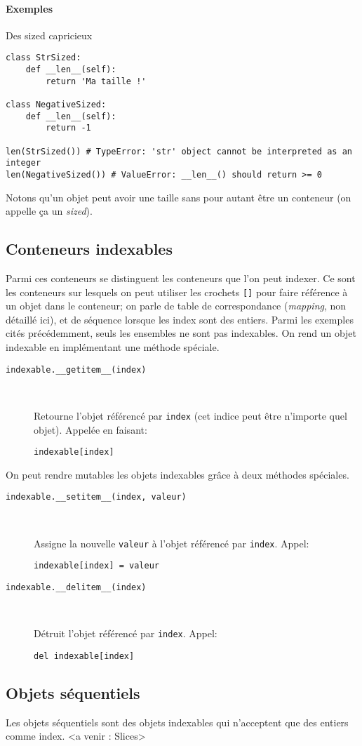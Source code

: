 \paragraph{Exemples} Des \og sized \fg{} capricieux
\begin{verbatim}
class StrSized:
    def __len__(self):
        return 'Ma taille !'

class NegativeSized:
    def __len__(self):
        return -1

len(StrSized()) # TypeError: 'str' object cannot be interpreted as an integer
len(NegativeSized()) # ValueError: __len__() should return >= 0
\end{verbatim}

Notons qu'un objet peut avoir une taille sans pour autant être un conteneur (on appelle ça un \emph{sized}).

\subsection{Conteneurs indexables}
Parmi ces conteneurs se distinguent les conteneurs que l'on peut indexer. Ce sont les conteneurs sur lesquels on peut utiliser les crochets \texttt{[]} pour faire référence à un objet dans le conteneur; on parle de table de correspondance (\emph{mapping}, non détaillé ici), et de séquence lorsque les index sont des entiers. Parmi les exemples cités précédemment, seuls les ensembles ne sont pas indexables. On rend un objet indexable en implémentant une méthode spéciale.

\begin{description}
    \item[\texttt{indexable.__getitem__(index)}]~

    Retourne l'objet référencé par \texttt{index} (cet indice peut être n'importe quel objet). Appelée en faisant:
    \begin{verbatim}
indexable[index]
    \end{verbatim}
\end{description}

On peut rendre mutables les objets indexables grâce à deux méthodes spéciales.

\begin{description}
    \item[\texttt{indexable.__setitem__(index, valeur)}]~

    Assigne la nouvelle \texttt{valeur} à l'objet référencé par \texttt{index}. Appel:
    \begin{verbatim}
indexable[index] = valeur
    \end{verbatim}

    \item[\texttt{indexable.__delitem__(index)}]~

    Détruit l'objet référencé par \texttt{index}. Appel:
    \begin{verbatim}
del indexable[index]
    \end{verbatim}
\end{description}

\subsection{Objets séquentiels}

Les objets séquentiels sont des objets indexables qui n'acceptent que des entiers comme index. <a venir : Slices>